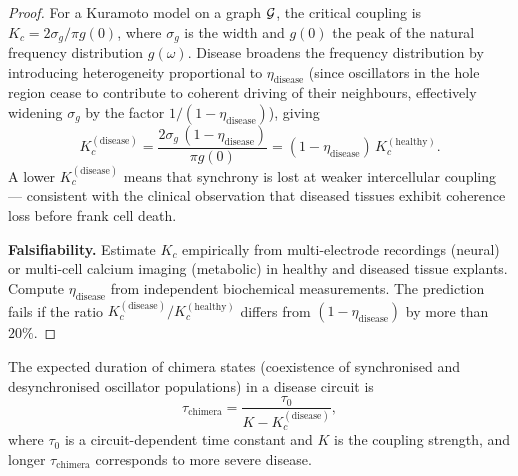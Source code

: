 \begin{proof}
For a Kuramoto model on a graph $\mathcal{G}$, the critical coupling is
$K_c = 2\sigma_g / \pi g(0)$, where $\sigma_g$ is the width and $g(0)$ the
peak of the natural frequency distribution $g(\omega)$.  Disease broadens the
frequency distribution by introducing heterogeneity proportional to
$\eta_{\mathrm{disease}}$ (since oscillators in the hole region cease to
contribute to coherent driving of their neighbours, effectively widening
$\sigma_g$ by the factor $1/(1 - \eta_{\mathrm{disease}})$), giving
\begin{equation}
  K_c^{(\mathrm{disease})}
  = \frac{2\sigma_g\,(1 - \eta_{\mathrm{disease}})}{\pi g(0)}
  = (1 - \eta_{\mathrm{disease}})\,K_c^{(\mathrm{healthy})}.
  \label{eq:ch07-Kc-derivation}
\end{equation}
A lower $K_c^{(\mathrm{disease})}$ means that synchrony is lost at weaker
intercellular coupling — consistent with the clinical observation that diseased
tissues exhibit coherence loss before frank cell death.

\textbf{Falsifiability.}  Estimate $K_c$ empirically from multi-electrode
recordings (neural) or multi-cell calcium imaging (metabolic) in healthy and
diseased tissue explants.  Compute $\eta_{\mathrm{disease}}$ from independent
biochemical measurements.  The prediction fails if the ratio
$K_c^{(\mathrm{disease})}/K_c^{(\mathrm{healthy})}$ differs from
$(1 - \eta_{\mathrm{disease}})$ by more than $20\%$.
\end{proof}

\begin{theorem}
\label{thm:ch07-P10}
The expected duration of chimera states (coexistence of synchronised and
desynchronised oscillator populations) in a disease circuit is
\begin{equation}
  \tau_{\mathrm{chimera}}
  = \frac{\tau_0}{K - K_c^{(\mathrm{disease})}},
  \label{eq:ch07-P10-chimera}
\end{equation}
where $\tau_0$ is a circuit-dependent time constant and $K$ is the coupling
strength, and longer $\tau_{\mathrm{chimera}}$ corresponds to more severe
disease.
\end{theorem}

